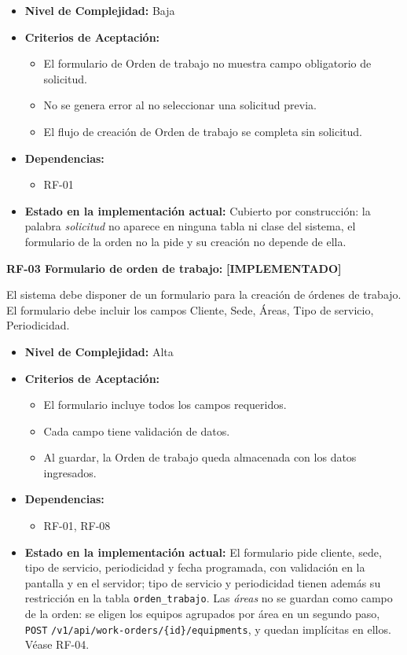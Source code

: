 \documentclass[12pt,a4paper]{article}
\newcommand{\ruta}[1]{\nolinkurl{#1}}
\newcommand{\estadoImplementado}{\textcolor{mainRed}{\textbf{[IMPLEMENTADO]}}}
\begin{document}
\begin{itemize}
  \item \textbf{Nivel de Complejidad:} Baja

  \item \textbf{Criterios de Aceptación:}
  \begin{itemize}
    \item El formulario de Orden de trabajo no muestra campo obligatorio de solicitud.
    \item No se genera error al no seleccionar una solicitud previa.
    \item El flujo de creación de Orden de trabajo se completa sin solicitud.
  \end{itemize}

  \item \textbf{Dependencias:}
  \begin{itemize}
    \item RF-01
  \end{itemize}

  \item \textbf{Estado en la implementación actual:} Cubierto por construcción: la palabra \emph{solicitud} no aparece en ninguna tabla ni clase del sistema, el formulario de la orden no la pide y su creación no depende de ella.
\end{itemize}

\textbf{RF-03 Formulario de orden de trabajo:} \estadoImplementado{}

El sistema debe disponer de un formulario para la creación de órdenes de trabajo. El formulario debe incluir los campos Cliente, Sede, Áreas, Tipo de servicio, Periodicidad.

\begin{itemize}
  \item \textbf{Nivel de Complejidad:} Alta

  \item \textbf{Criterios de Aceptación:}
  \begin{itemize}
    \item El formulario incluye todos los campos requeridos.
    \item Cada campo tiene validación de datos.
    \item Al guardar, la Orden de trabajo queda almacenada con los datos ingresados.
  \end{itemize}

  \item \textbf{Dependencias:}
  \begin{itemize}
    \item RF-01, RF-08
  \end{itemize}

  \item \textbf{Estado en la implementación actual:} El formulario pide cliente, sede, tipo de servicio, periodicidad y fecha programada, con validación en la pantalla y en el servidor; tipo de servicio y periodicidad tienen además su restricción en la tabla \texttt{orden\_trabajo}. Las \emph{áreas} no se guardan como campo de la orden: se eligen los equipos agrupados por área en un segundo paso, \texttt{POST} \ruta{/v1/api/work-orders/{id}/equipments}, y quedan implícitas en ellos. Véase RF-04.
\end{itemize}
\end{document}
